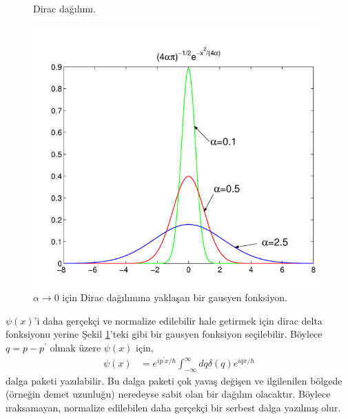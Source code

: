\documentclass[a4paper,12pt, twoside]{article}
\begin{document}
\begin{enumerate}
\begin{figure}[hbtp]
\begin{minipage}{.45\textwidth}
	\caption{Dirac dağılımı.}
	\label{fig:diracdistribution}
	\end{minipage}
	\begin{minipage}{.10\textwidth}
		\hspace{12pt}
	\end{minipage}
	\begin{minipage}{.45\textwidth}
	\centering
	\includegraphics[width=.7\linewidth]{Dirac_delta_gaussian.png}
	\caption{$\alpha \rightarrow 0$ için Dirac dağılımına yaklaşan bir gausyen fonksiyon.}
	\label{fig:diracdistribution1}
    \end{minipage}
    \end{figure}			
	$\psi(x)$'i daha gerçekçi ve normalize edilebilir hale getirmek için dirac delta fonksiyonu yerine Şekil \ref{fig:diracdistribution1}'teki gibi bir gausyen fonksiyon seçilebilir. Böylece $q=p-p^\prime$ olmak üzere $\psi(x)$ için,
	\begin{align}
	\psi ( x )  
	&= e ^ { i p^\prime x /\hbar }  \int _ { - \infty } ^ { \infty } d q  \delta ( q )  e ^ { i q x /\hbar }
	\end{align}
	dalga paketi yazılabilir. Bu dalga paketi çok yavaş değişen ve ilgilenilen bölgede (örneğin demet uzunluğu) neredeyse sabit olan bir dağılım olacaktır. Böylece ıraksamayan, normalize edilebilen daha gerçekçi bir serbest dalga yazılmış olur.
	

\end{enumerate}
\end{document}

